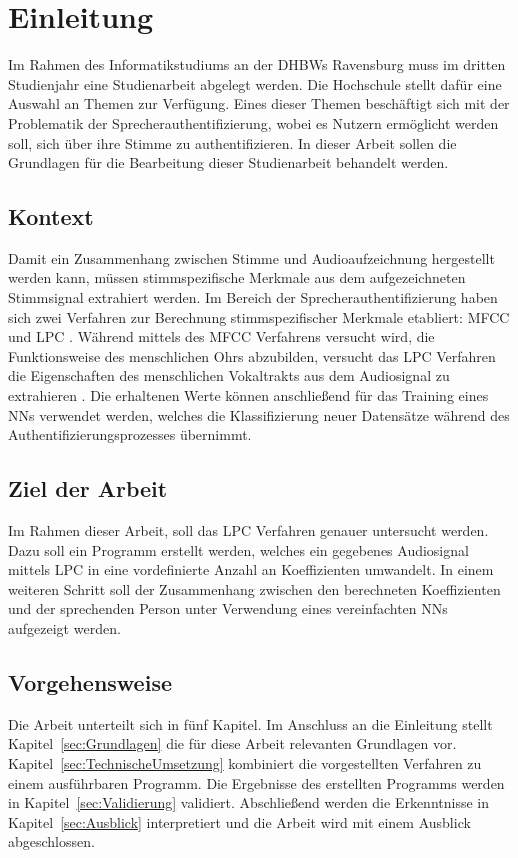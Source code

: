\section{Einleitung}\label{sec:Einleitung}
Im Rahmen des Informatikstudiums an der \acp{DHBW} Ravensburg muss im dritten Studienjahr eine Studienarbeit abgelegt werden.
Die Hochschule stellt dafür eine Auswahl an Themen zur Verfügung.
Eines dieser Themen beschäftigt sich mit der Problematik der Sprecherauthentifizierung, wobei es Nutzern ermöglicht werden soll, sich über ihre Stimme zu authentifizieren.
In dieser Arbeit sollen die Grundlagen für die Bearbeitung dieser Studienarbeit behandelt werden.

\subsection{Kontext}
Damit ein Zusammenhang zwischen Stimme und Audioaufzeichnung hergestellt werden kann, müssen stimm\-spezifische Merkmale aus dem aufgezeichneten Stimmsignal extrahiert werden.
Im Bereich der Sprecherauthentifizierung haben sich zwei Verfahren zur Berechnung stimm\-spezifischer Merkmale etabliert: \ac{MFCC} und \ac{LPC} \autocite[vgl.][S. 116]{sidorov_text-independent_2010}\autocite[vgl.][S. 726]{chelali_text_2017}.
Während mittels des \ac{MFCC} Verfahrens versucht wird, die Funktionsweise des menschlichen Ohrs abzubilden, versucht das \ac{LPC} Verfahren die Eigenschaften des menschlichen Vokaltrakts aus dem Audiosignal zu extrahieren \autocite[vgl.][S. 117]{sidorov_text-independent_2010}.
Die erhaltenen Werte können anschließend für das Training eines \acp{NN} verwendet werden, welches die Klassifizierung neuer Datensätze während des Authentifizierungsprozesses übernimmt.

\subsection{Ziel der Arbeit}
Im Rahmen dieser Arbeit, soll das \ac{LPC} Verfahren genauer untersucht werden.
Dazu soll ein Programm erstellt werden, welches ein gegebenes Audiosignal mittels \ac{LPC} in eine vordefinierte Anzahl an Koeffizienten umwandelt.
In einem weiteren Schritt soll der Zusammenhang zwischen den berechneten Koeffizienten und der sprechenden Person unter Verwendung eines vereinfachten \acp{NN} aufgezeigt werden.

\subsection{Vorgehensweise}
Die Arbeit unterteilt sich in fünf Kapitel.
Im Anschluss an die Einleitung stellt Kapitel~\ref{sec:Grundlagen} die für diese Arbeit relevanten Grundlagen vor.
Kapitel~\ref{sec:TechnischeUmsetzung} kombiniert die vorgestellten Verfahren zu einem ausführbaren Programm.
Die Ergebnisse des erstellten Programms werden in Kapitel~\ref{sec:Validierung} validiert.
Abschließend werden die Erkenntnisse in Kapitel~\ref{sec:Ausblick} interpretiert und die Arbeit wird mit einem Ausblick abgeschlossen.